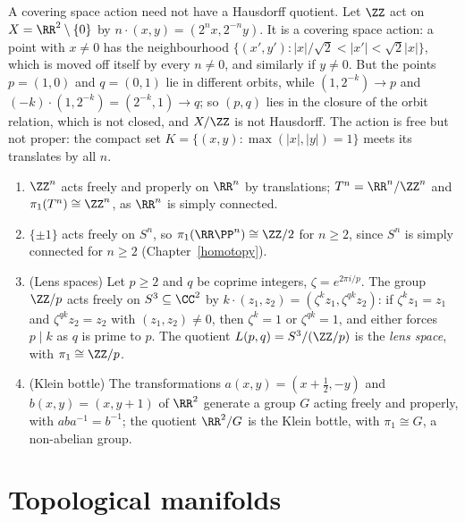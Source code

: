 \begin{counterexample}\label{topological-manifolds:counterexample-non-hausdorff-quotient}
A covering space action need not have a Hausdorff quotient. Let $\ZZ$ act on $X = \RR^2 \setminus \{0\}$ by $n \cdot (x, y) = (2^nx, 2^{-n}y)$. It is a covering space action: a point with $x \neq 0$ has the neighbourhood
$\{(x', y') : |x|/\sqrt2 < |x'| < \sqrt2|x|\}$, which is moved off itself by every $n \neq 0$, and similarly if $y \neq 0$. But the points $p = (1, 0)$ and $q = (0, 1)$ lie in different orbits, while
$(1, 2^{-k}) \to p$ and $(-k) \cdot (1, 2^{-k}) = (2^{-k}, 1) \to q$; so $(p, q)$ lies in the closure of the orbit relation, which is not closed, and $X/\ZZ$ is not Hausdorff. The action is free but not proper: the compact set
$K = \{(x, y) : \max(|x|, |y|) = 1\}$ meets its translates by all $n$.
\end{counterexample}

\begin{example}\label{topological-manifolds:example-covering-actions}
\begin{enumerate}
\item $\ZZ^n$ acts freely and properly on $\RR^n$ by translations; $T^n = \RR^n/\ZZ^n$ and $\pi_1(T^n) \cong \ZZ^n$, as $\RR^n$ is simply connected.
\item $\{\pm1\}$ acts freely on $S^n$, so $\pi_1(\RR\PP^n) \cong \ZZ/2$ for $n \geq 2$, since $S^n$ is simply connected for $n \geq 2$ (Chapter~\ref{homotopy}).
\item (Lens spaces) Let $p \geq 2$ and $q$ be coprime integers, $\zeta = e^{2\pi i/p}$. The group $\ZZ/p$ acts freely on $S^3 \subseteq \CC^2$ by $k \cdot (z_1, z_2) = (\zeta^kz_1, \zeta^{qk}z_2)$: if $\zeta^kz_1 = z_1$ and
$\zeta^{qk}z_2 = z_2$ with $(z_1, z_2) \neq 0$, then $\zeta^k = 1$ or $\zeta^{qk} = 1$, and either forces $p \mid k$ as $q$ is prime to $p$. The quotient $L(p, q) = S^3/(\ZZ/p)$ is the \emph{lens space}, with
$\pi_1 \cong \ZZ/p$.
\item (Klein bottle) The transformations $a(x, y) = (x + \frac12, -y)$ and $b(x, y) = (x, y + 1)$ of $\RR^2$ generate a group $G$ acting freely and properly, with $aba^{-1} = b^{-1}$; the quotient $\RR^2/G$ is the Klein bottle, with
$\pi_1 \cong G$, a non-abelian group.
\end{enumerate}
\end{example}

\section{Topological manifolds}\label{topological-manifolds:section-manifolds}

